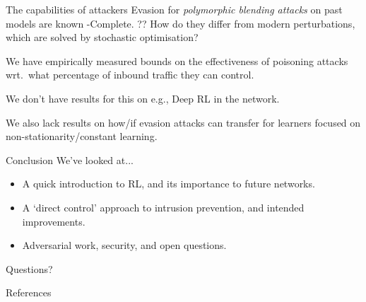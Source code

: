 \documentclass[aspectratio=169,xcolor={dvipsnames}
,hide notes
]{beamer}
\begin{document}
\begin{frame}{The capabilities of attackers}
	Evasion for \emph{polymorphic blending attacks} on past models are known \NP-Complete. ?? How do they differ from modern perturbations, which are solved by stochastic optimisation?
	
	We have empirically measured bounds on the effectiveness of poisoning attacks wrt.\ what percentage of inbound traffic they can control.
	
	We don't have results for this on e.g., Deep RL in the network.
	
	We also lack results on how/if evasion attacks can transfer for learners focused on non-stationarity/constant learning.
\end{frame}

\begin{frame}[standout]{Conclusion}
	We've looked at...
	\begin{itemize}
		\item A quick introduction to RL, and its \alert{importance to future networks}.
		\item A `direct control' approach to intrusion prevention, and \alert{intended improvements}.
		\item Adversarial work, security, and open questions.
	\end{itemize}
	
	\alert{Questions?}
\end{frame}

\appendix

\begin{frame}[allowframebreaks]{References}
\printbibliography[heading=none]
\end{frame}
\end{document}
